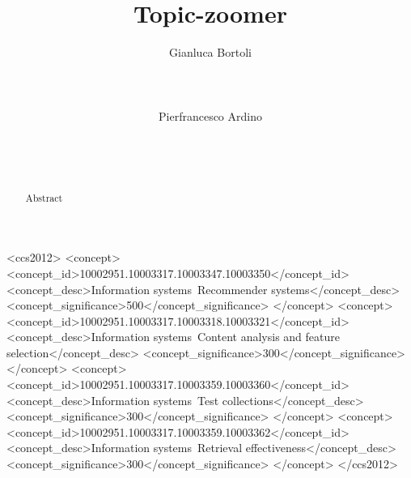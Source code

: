 \documentclass{sig-alternate-05-2015}
\begin{document}
\title{Topic-zoomer}

\author{
\alignauthor
Gianluca Bortoli\\
       \\
       \\
       \\
\alignauthor
Pierfrancesco Ardino\\
       \\
	   \\
       \\
}
\maketitle

\begin{abstract}
Abstract
\cite{*} %
\end{abstract}

\begin{CCSXML}
	<ccs2012>
	<concept>
	<concept_id>10002951.10003317.10003347.10003350</concept_id>
	<concept_desc>Information systems~Recommender systems</concept_desc>
	<concept_significance>500</concept_significance>
	</concept>
	<concept>
	<concept_id>10002951.10003317.10003318.10003321</concept_id>
	<concept_desc>Information systems~Content analysis and feature selection</concept_desc>
	<concept_significance>300</concept_significance>
	</concept>
	<concept>
	<concept_id>10002951.10003317.10003359.10003360</concept_id>
	<concept_desc>Information systems~Test collections</concept_desc>
	<concept_significance>300</concept_significance>
	</concept>
	<concept>
	<concept_id>10002951.10003317.10003359.10003362</concept_id>
	<concept_desc>Information systems~Retrieval effectiveness</concept_desc>
	<concept_significance>300</concept_significance>
	</concept>
	</ccs2012>
\end{CCSXML}


\printccsdesc

\end{document}
